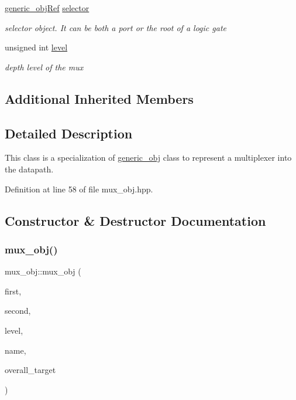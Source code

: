 \begin{DoxyCompactItemize}
\hyperlink{generic__obj_8hpp_acb533b2ef8e0fe72e09a04d20904ca81}{generic\+\_\+obj\+Ref} \hyperlink{classmux__obj_a0a211db0b9945ff54667d263c9bf4cdb}{selector}
\begin{DoxyCompactList}\small\item\em selector object. It can be both a port or the root of a logic gate \end{DoxyCompactList}\item 
unsigned int \hyperlink{classmux__obj_a1134826e354b1af20b7ea8f260772965}{level}
\begin{DoxyCompactList}\small\item\em depth level of the mux \end{DoxyCompactList}\end{DoxyCompactItemize}
\subsection*{Additional Inherited Members}


\subsection{Detailed Description}
This class is a specialization of \hyperlink{classgeneric__obj}{generic\+\_\+obj} class to represent a multiplexer into the datapath. 

Definition at line 58 of file mux\+\_\+obj.\+hpp.



\subsection{Constructor \& Destructor Documentation}
\mbox{\label{classmux__obj_a4293bb84de54083300493e69e5d4b04a}} 
\subsubsection{\texorpdfstring{mux\+\_\+obj()}{mux\_obj()}}
{\footnotesize\ttfamily mux\+\_\+obj\+::mux\+\_\+obj (\begin{DoxyParamCaption}\item[{const \hyperlink{generic__obj_8hpp_acb533b2ef8e0fe72e09a04d20904ca81}{generic\+\_\+obj\+Ref}}]{first,  }\item[{const \hyperlink{generic__obj_8hpp_acb533b2ef8e0fe72e09a04d20904ca81}{generic\+\_\+obj\+Ref}}]{second,  }\item[{unsigned int}]{level,  }\item[{const std\+::string \&}]{name,  }\item[{const \hyperlink{generic__obj_8hpp_acb533b2ef8e0fe72e09a04d20904ca81}{generic\+\_\+obj\+Ref}}]{overall\+\_\+target }\end{DoxyParamCaption})}



